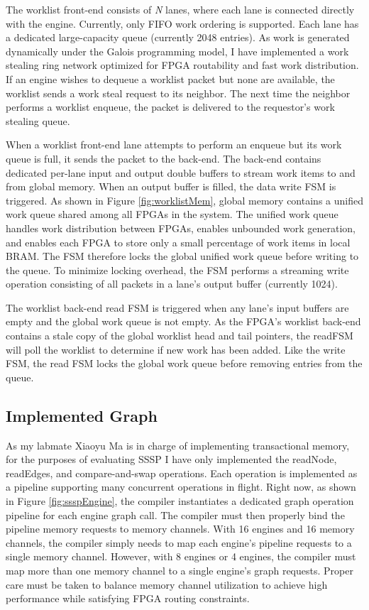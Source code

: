 The worklist front-end consists of \textit{N} lanes, where each lane is connected directly with the engine. Currently, 
only FIFO work ordering is supported. Each lane has a dedicated large-capacity queue (currently 2048 entries). As work 
is generated dynamically under the Galois programming model, I have implemented a work stealing ring network optimized 
for FPGA routability and fast work distribution. If an engine wishes to dequeue a worklist packet but none are 
available, the worklist sends a work steal request to its neighbor. The next time the neighbor performs a worklist 
enqueue, the packet is delivered to the requestor's work stealing queue.

When a worklist front-end lane attempts to perform an enqueue but its work queue is full, it sends the packet to the 
back-end. The back-end contains dedicated per-lane input and output double buffers to stream work items to and from 
global memory. When an output buffer is filled, the data write FSM is triggered. As shown in Figure 
\ref{fig:worklistMem}, global memory contains a unified work queue shared among all FPGAs in the system. The unified 
work queue handles work distribution between FPGAs, enables unbounded work generation, and enables each FPGA to store 
only a small percentage of work items in local BRAM. The FSM therefore locks the global unified work queue before 
writing to the queue. To minimize locking overhead, the FSM performs a streaming write operation consisting of all packets 
in a lane's output buffer (currently 1024). 

The worklist back-end read FSM is triggered when any lane's input buffers are empty and the global work queue is not 
empty. As the FPGA's worklist back-end contains a stale copy of the global worklist head and tail pointers, the 
readFSM will poll the worklist to determine if new work has been added. Like the write FSM, the read FSM locks the 
global work queue before removing entries from the queue.

\subsection{Implemented Graph}

As my labmate Xiaoyu Ma is in charge of implementing transactional memory, for the purposes of evaluating SSSP I have 
only implemented the readNode, readEdges, and compare-and-swap operations. Each operation is implemented as a pipeline 
supporting many concurrent operations in flight. Right now, as shown in Figure \ref{fig:ssspEngine}, the compiler 
instantiates a dedicated graph operation pipeline for each engine graph call. The compiler must then properly bind the 
pipeline memory requests to memory channels. With 16 engines and 16 memory channels, the compiler simply needs to map 
each engine's pipeline requests to a single memory channel. However, with 8 engines or 4 engines, the compiler must 
map more than one memory channel to a single engine's graph requests. Proper care must be taken to balance memory 
channel utilization to achieve high performance while satisfying FPGA routing constraints.


